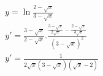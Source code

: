 \begin{ex}
\begin{align}
&y=\ln{\frac{2-\sqrt{x}}{3-\sqrt{x}}}\nonumber\\
&y'=\frac{3-\sqrt{x}}{2-\sqrt{x}}.\frac{\frac{3-\sqrt{x}}{2\sqrt{x}}-\frac{2-\sqrt{x}}{3\sqrt{x}}}{(3-\sqrt{x})^2}\nonumber\\
&y'=\frac{1}{2\sqrt{x}(3-\sqrt{x})(\sqrt{x}-2)}\nonumber
\end{align}
\end{ex}